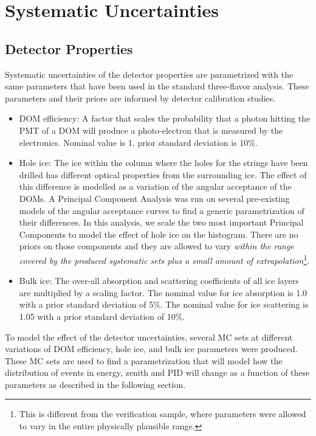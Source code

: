 \section{Systematic Uncertainties}

\subsection{Detector Properties}
\label{sec:detector-unc}
Systematic uncertainties of the detector properties are parametrized with the same parameters that have been used in the standard three-flavor analysis. These parameters and their priors are informed by detector calibration studies.
\begin{itemize}
    \item DOM efficiency: A factor that scales the probability that a photon hitting the PMT of a DOM will produce a photo-electron that is measured by the electronics. Nominal value is 1, prior standard deviation is 10\%.
    \item Hole ice: The ice within the column where the holes for the strings have been drilled has different optical properties from the surrounding ice. The effect of this difference is modelled as a variation of the angular acceptance of the DOMs. A Principal Component Analysis was run on several pre-existing models of the angular acceptance curves to find a generic parametrization of their differences. In this analysis, we scale the two most important Principal Components to model the effect of hole ice on the histogram. There are no priors on those components and they are allowed to vary \emph{within the range covered by the produced systematic sets plus a small amount of extrapolation}\footnote{This is different from the verification sample, where parameters were allowed to vary in the entire physically plausible range.}.
    \item Bulk ice: The over-all absorption and scattering coefficients of all ice layers are multiplied by a scaling factor. The nominal value for ice absorption is 1.0 with a prior standard deviation of 5\%. The nominal value for ice scattering is 1.05 with a prior standard deviation of 10\%.
\end{itemize}

To model the effect of the detector uncertainties, several MC sets at different variations of DOM efficiency, hole ice, and bulk ice parameters were produced. These MC sets are used to find a parametrization that will model how the distribution of events in energy, zenith and PID will change as a function of these parameters as described in the following section.

